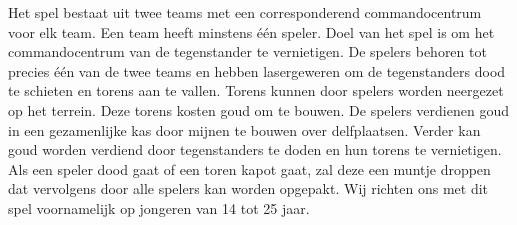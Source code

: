 Het spel bestaat uit twee teams met een corresponderend commandocentrum voor elk team. Een team heeft minstens \'e\'en speler. Doel van het spel is om het commandocentrum van de tegenstander te vernietigen. De spelers behoren tot precies \'e\'en van de twee teams en hebben lasergeweren om de tegenstanders dood te schieten en torens aan te vallen. Torens kunnen door spelers worden neergezet op het terrein. Deze torens kosten goud om te bouwen. De spelers verdienen goud in een gezamenlijke kas door mijnen te bouwen over delfplaatsen. Verder kan goud worden verdiend door tegenstanders te doden en hun torens te vernietigen. Als een speler dood gaat of een toren kapot gaat, zal deze een muntje droppen dat vervolgens door alle spelers kan worden opgepakt. Wij richten ons met dit spel voornamelijk op jongeren van 14 tot 25 jaar.

